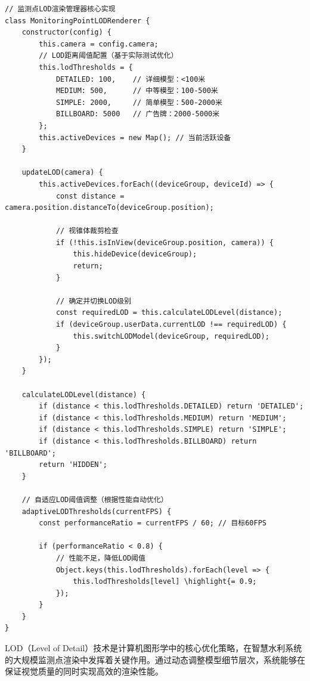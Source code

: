 \begin{lstlisting}[style=javascript]
// 监测点LOD渲染管理器核心实现
class MonitoringPointLODRenderer {
    constructor(config) {
        this.camera = config.camera;
        // LOD距离阈值配置（基于实际测试优化）
        this.lodThresholds = {
            DETAILED: 100,    // 详细模型：<100米
            MEDIUM: 500,      // 中等模型：100-500米
            SIMPLE: 2000,     // 简单模型：500-2000米
            BILLBOARD: 5000   // 广告牌：2000-5000米
        };
        this.activeDevices = new Map(); // 当前活跃设备
    }
    
    updateLOD(camera) {
        this.activeDevices.forEach((deviceGroup, deviceId) => {
            const distance = camera.position.distanceTo(deviceGroup.position);
            
            // 视锥体裁剪检查
            if (!this.isInView(deviceGroup.position, camera)) {
                this.hideDevice(deviceGroup);
                return;
            }
            
            // 确定并切换LOD级别
            const requiredLOD = this.calculateLODLevel(distance);
            if (deviceGroup.userData.currentLOD !== requiredLOD) {
                this.switchLODModel(deviceGroup, requiredLOD);
            }
        });
    }
    
    calculateLODLevel(distance) {
        if (distance < this.lodThresholds.DETAILED) return 'DETAILED';
        if (distance < this.lodThresholds.MEDIUM) return 'MEDIUM';
        if (distance < this.lodThresholds.SIMPLE) return 'SIMPLE';
        if (distance < this.lodThresholds.BILLBOARD) return 'BILLBOARD';
        return 'HIDDEN';
    }
    
    // 自适应LOD阈值调整（根据性能自动优化）
    adaptiveLODThresholds(currentFPS) {
        const performanceRatio = currentFPS / 60; // 目标60FPS
        
        if (performanceRatio < 0.8) {
            // 性能不足，降低LOD阈值
            Object.keys(this.lodThresholds).forEach(level => {
                this.lodThresholds[level] \highlight{= 0.9;
            });
        }
    }
}
\end{lstlisting}


LOD（Level of Detail）技术是计算机图形学中的核心优化策略，在智慧水利系统的大规模监测点渲染中发挥着关键作用。通过动态调整模型细节层次，系统能够在保证视觉质量的同时实现高效的渲染性能。

